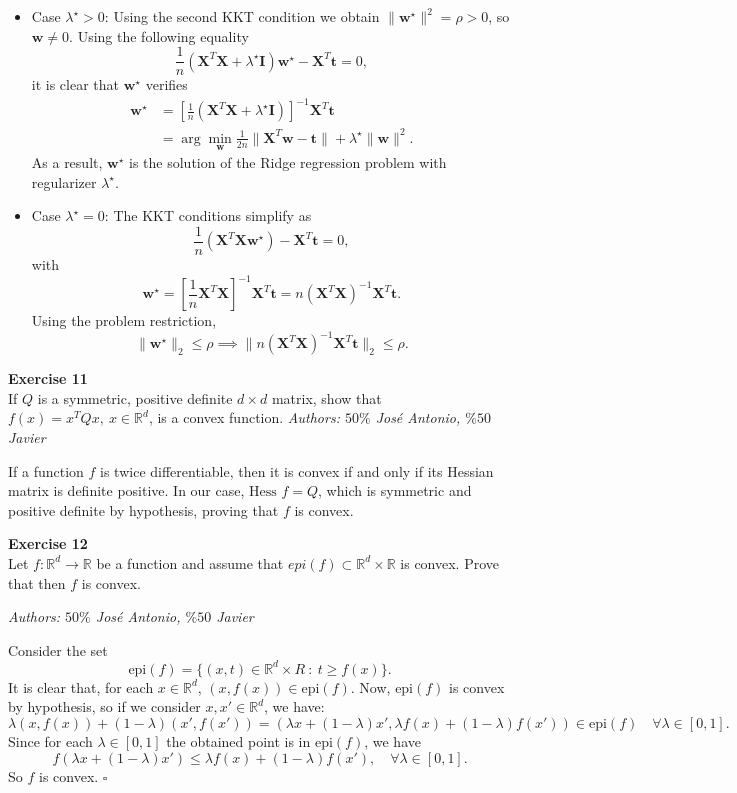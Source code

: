 \documentclass[11pt,table]{article}
\newcommand{\qed}{\hfill $\square$}
\newenvironment{problem}[2][Exercise]
{ \begin{mdframed}[backgroundcolor=gray!20] \textbf{#1 #2} \\}
	{\hspace{0.0cm}\newline\newline \emph{Authors: \(50\%\) José Antonio, \(\%50\) Javier}  \end{mdframed}}
\newcommand\R{\mathbb R}
\begin{document}
\begin{itemize}
	\item Case $\lambda^\star > 0$: Using the second KKT condition we obtain \(\|\bm{w}^\star\|^2 = \rho > 0\), so \(\bm{w} \neq 0\).
	      Using the following equality
	      \[
		      \frac{1}{n} (\bm{X}^T \bm{X} + \lambda^\star \bm{I})\bm{w}^\star - \bm{X}^T\bm{t} = 0,
	      \]
	      it is clear that \(\bm{w}^\star\) verifies
	      \[\begin{aligned}
			      \bm{w}^\star & = \left[ \frac{1}{n} (\bm{X}^T \bm{X} + \lambda^\star \bm{I})\right]^{-1}\bm{X}^T \bm{t}     \\
			                   & = \arg \min_{\bm{w}} \frac{1}{2n} \|\bm{X}^T \bm{w} - \bm{t}\| + \lambda^\star \|\bm{w}\|^2.
		      \end{aligned}\]
	      As a result, \(\bm{w}^\star\) is the solution of the Ridge regression problem with regularizer \(\lambda^\star\).
	\item Case \(\lambda^\star = 0\): The KKT conditions simplify as
	      \[
		      \frac{1}{n} \left(\bm{X}^T \bm{X}\bm{w}^\star\right) - \bm{X}^T\bm{t} = 0,
	      \]
	      with
	      \[
		      \bm{w}^\star = \left[ \frac{1}{n} \bm{X}^T \bm{X}\right]^{-1}\bm{X}^T \bm{t} = n(\bm X^T\bm X)^{-1} \bm X^T\bm{t}.
	      \]
	      Using the problem restriction,
	      \[
		      \|\bm{w}^\star\|_2 \leq \rho \implies \| n(\bm X^T\bm X)^{-1} \bm X^T\bm{t} \|_2 \leq \rho.
	      \]
\end{itemize}



\begin{problem}{11}
If \( Q \) is a symmetric, positive definite \( d \times d \) matrix, show that \( f(x) = x^TQx, \ x \in \mathbb{R}^d \), is a convex function.
\end{problem}

If a function $f$ is twice differentiable, then it is convex if and only if its Hessian matrix is definite positive. In our case, $\text{Hess }f = Q$, which is symmetric and positive definite by hypothesis, proving that $f$ is convex. \\

\begin{problem}{12}
Let \( f:\mathbb{R}^d \to \mathbb{R} \)  be a function and assume that \( epi(f) \subset \mathbb{R}^d \times \mathbb{R} \)  is convex. Prove that then \( f \)  is convex.

\end{problem}

Consider the set
\[
	\text{epi}(f) = \{(x,t)\in \R^d \times R \ : \ t \geq f(x)\}.
\]
It is clear that, for each \(x \in \R^d\), \((x,f(x))\in \text{epi}(f)\). Now, \(\text{epi}(f)\) is convex by hypothesis, so if we consider \(x,x'\in \R^d\), we have:
\[
	\lambda(x,f(x)) + (1-\lambda)(x',f(x')) = \left(\lambda x + (1-\lambda)x', \lambda f(x) + (1-\lambda)f(x')\right) \in \text{epi}(f)\quad \forall \lambda \in [0,1].
\]
Since for each \(\lambda \in [0,1]\) the obtained point is in \(\text{epi}(f)\), we have
\[
	f(\lambda x + (1-\lambda)x') \leq \lambda f(x) + (1-\lambda)f(x'), \quad \forall \lambda \in [0,1].
\]
So \(f\) is convex. \qed \\
\end{document}
